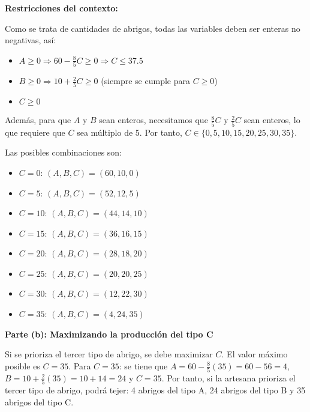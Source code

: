 \begin{prob}
\begin{myproof}
\textbf{Restricciones del contexto:}

Como se trata de cantidades de abrigos, todas las variables deben ser enteras no negativas, así:
\begin{itemize}
\item $A \geq 0 \Rightarrow 60 - \frac{8}{5}C \geq 0 \Rightarrow C \leq 37.5$
\item $B \geq 0 \Rightarrow 10 + \frac{2}{5}C \geq 0$ (siempre se cumple para $C \geq 0$)
\item $C \geq 0$
\end{itemize}

Además, para que $A$ y $B$ sean enteros, necesitamos que $\frac{8}{5}C$ y $\frac{2}{5}C$ sean enteros, lo que requiere que $C$ sea múltiplo de 5. Por tanto, $C \in \{0, 5, 10, 15, 20, 25, 30, 35\}$.

Las posibles combinaciones son:
\begin{itemize}
\item $C = 0$: $(A, B, C) = (60, 10, 0)$
\item $C = 5$: $(A, B, C) = (52, 12, 5)$
\item $C = 10$: $(A, B, C) = (44, 14, 10)$
\item $C = 15$: $(A, B, C) = (36, 16, 15)$
\item $C = 20$: $(A, B, C) = (28, 18, 20)$
\item $C = 25$: $(A, B, C) = (20, 20, 25)$
\item $C = 30$: $(A, B, C) = (12, 22, 30)$
\item $C = 35$: $(A, B, C) = (4, 24, 35)$
\end{itemize}

\textbf{Parte (b): Maximizando la producción del tipo C}

Si se prioriza el tercer tipo de abrigo, se debe maximizar $C$. El valor máximo posible es $C = 35$. Para $C = 35$: se tiene que $A = 60 - \frac{8}{5}(35) = 60 - 56 = 4,$ $B = 10 + \frac{2}{5}(35) = 10 + 14 = 24$ y $C = 35.$ Por tanto, si la artesana prioriza el tercer tipo de abrigo, podrá tejer: 4 abrigos del tipo A, 24 abrigos del tipo B  y 35 abrigos del tipo C.
\end{myproof}
\end{prob}

